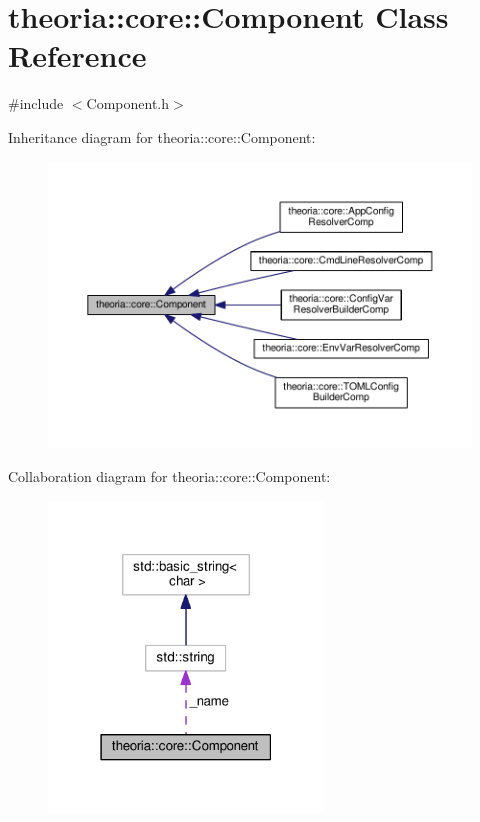 \hypertarget{classtheoria_1_1core_1_1Component}{}\section{theoria\+:\+:core\+:\+:Component Class Reference}
\label{classtheoria_1_1core_1_1Component}


{\ttfamily \#include $<$Component.\+h$>$}



Inheritance diagram for theoria\+:\+:core\+:\+:Component\+:\nopagebreak
\begin{figure}[H]
\begin{center}
\leavevmode
\includegraphics[width=350pt]{classtheoria_1_1core_1_1Component__inherit__graph}
\end{center}
\end{figure}


Collaboration diagram for theoria\+:\+:core\+:\+:Component\+:\nopagebreak
\begin{figure}[H]
\begin{center}
\leavevmode
\includegraphics[width=207pt]{classtheoria_1_1core_1_1Component__coll__graph}
\end{center}
\end{figure}
